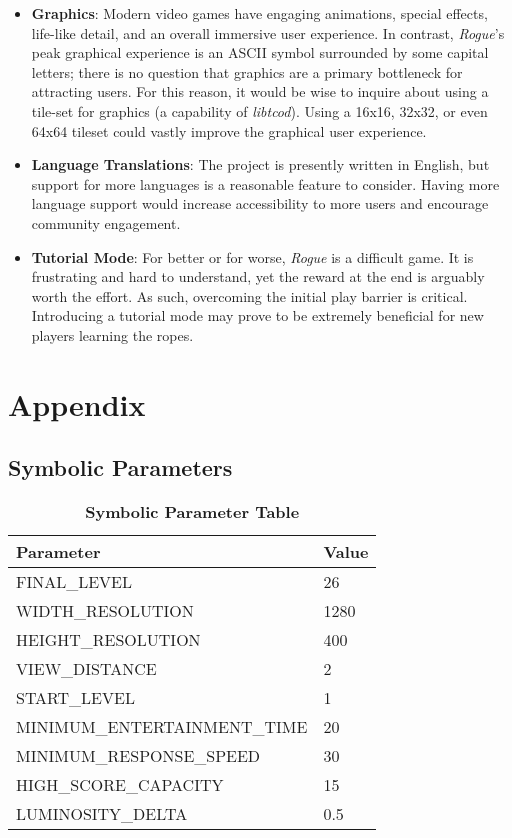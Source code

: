 \documentclass[12pt, titlepage]{article}
\begin{document}
		\begin{itemize}
			\item \textbf{Graphics}: Modern video games have engaging animations, special effects, life-like detail, and an overall immersive user experience.  In contrast, \textit{Rogue}'s peak graphical experience is an ASCII symbol surrounded by some capital letters; there is no question that graphics are a primary bottleneck for attracting users. For this reason, it would be wise to inquire about using a tile-set for graphics (a capability of \textit{libtcod}).  Using a 16x16, 32x32, or even 64x64 tileset could vastly improve the graphical user experience.

			\item \textbf{Language Translations}: The project is presently written in English, but support for more languages is a reasonable feature to consider.  Having more language support would increase accessibility to more users and encourage community engagement.

			\item \textbf{Tutorial Mode}: For better or for worse, \textit{Rogue} is a difficult game.  It is frustrating and hard to understand, yet the reward at the end is arguably worth the effort.  As such, overcoming the initial play barrier is critical.  Introducing a tutorial mode may prove to be extremely beneficial for new players learning the ropes.
		\end{itemize}

\newpage





\newpage

\section{Appendix}

	\subsection{Symbolic Parameters}

	\begin{table}[h!]
		\centering
		\caption{\textbf{Symbolic Parameter Table}}
		\label{symbolicParameters}
		\bigskip
		\def\arraystretch{1.6}


		\begin{tabular}{| C{20em} | C{5em} |}
			\bottomrule
			\textbf{Parameter} & \textbf{Value} \\
			\hline
			FINAL\_LEVEL & 26 \\
			WIDTH\_RESOLUTION & 1280 \\
			HEIGHT\_RESOLUTION & 400 \\
			VIEW\_DISTANCE & 2 \\
			START\_LEVEL & 1 \\
			MINIMUM\_ENTERTAINMENT\_TIME & 20 \\
			MINIMUM\_RESPONSE\_SPEED & 30 \\
			HIGH\_SCORE\_CAPACITY & 15 \\
			LUMINOSITY\_DELTA & 0.5 \\
			\toprule
		\end{tabular}
	\end{table}
\end{document}
